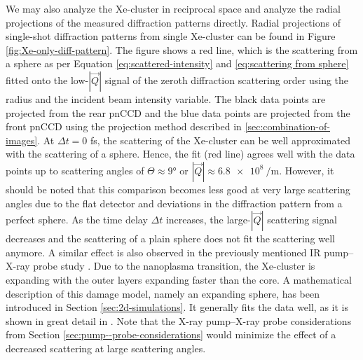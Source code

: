 We may also analyze the Xe-cluster in reciprocal space and analyze the radial projections of the measured diffraction patterns directly. Radial projections of single-shot diffraction patterns from single Xe-cluster can be found in Figure \ref{fig:Xe-only-diff-pattern}. The figure shows a red line, which is the scattering from a sphere as per Equation \eqref{eq:scattered-intensity} and \eqref{eq:scattering from sphere} fitted onto the low-$\left|\vec{Q}\right|$ signal of the zeroth diffraction scattering order using the radius and the incident beam intensity variable. The black data points are projected from the rear pnCCD and the blue data points are projected from the front pnCCD using the projection method described in \ref{sec:combination-of-images}. At $\Delta t=0$ fs, the scattering of the Xe-cluster can be well approximated with the scattering of a sphere. Hence, the fit (red line) agrees well with the data points up to scattering angles of $\Theta \approx 9$° or $\left|\vec{Q}\right|\approx\SI{6.8e8}{\per\meter}$. However, it should be noted that this comparison becomes less good at very large scattering angles due to the flat detector \citep{Bostedt-2012-PRL} and deviations in the diffraction pattern from a perfect sphere. As the time delay $\Delta t$ increases, the large-$\left|\vec{Q}\right|$ scattering signal decreases and the scattering of a plain sphere does not fit the scattering well anymore. A similar effect is also observed in the previously mentioned IR pump--X-ray probe study \citep{Gorkhover-2016-NatPho}. Due to the nanoplasma transition, the Xe-cluster is expanding with the outer layers expanding faster than the core. A mathematical description of this damage model, namely an expanding sphere, has been introduced in Section \ref{sec:2d-simulations}. It generally fits the data well, as it is shown in great detail in \citep{Gorkhover-2016-NatPho,Gorkhover-2014-Thesis}. Note that the X-ray pump--X-ray probe considerations from Section \ref{sec:pump--probe-considerations} would minimize the effect of a decreased scattering at large scattering angles.
%
%
%
